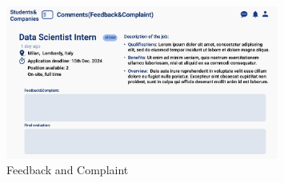 \begin{figure}
    \centering
    \includegraphics[width=0.8\textwidth]{Images/UI/FeedBack&Complaint- University view.png}
    \caption{Feedback and Complaint}\label{fig:Feedback and Complaint University}
\end{figure}